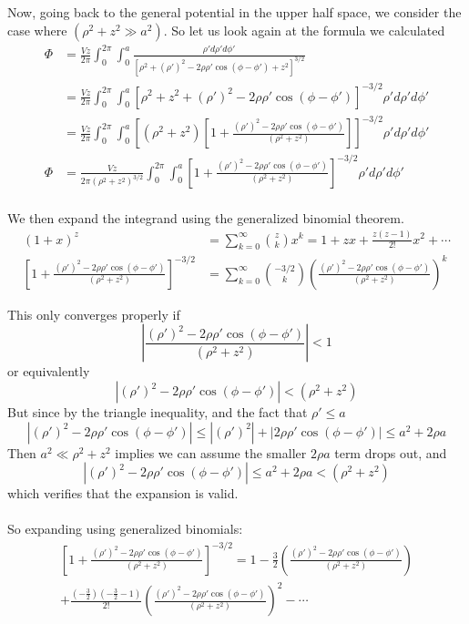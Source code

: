 \documentclass{article}
\begin{document}
Now, going back to the general potential in the upper half space, we consider the case where $(\rho^{2}+z^{2}\gg a^{2})$. So let us look again at the formula we calculated
\begin{align*}
\Phi &= \frac{Vz}{2\pi} \int_{0}^{2\pi}\int_{0}^{a} \frac{\rho' d\rho'd\phi'}{[\rho^{2} + (\rho')^{2} - 2\rho\rho'\cos(\phi-\phi') + z^{2}]^{3/2}}\\
&= \frac{Vz}{2\pi} \int_{0}^{2\pi}\int_{0}^{a} \left[\rho^{2} + z^{2} + (\rho')^{2} - 2\rho\rho'\cos(\phi-\phi')\right]^{-3/2}\rho' d\rho'd\phi'\\
&= \frac{Vz}{2\pi} \int_{0}^{2\pi}\int_{0}^{a} \left[(\rho^{2} + z^{2})\left[1 + \frac{(\rho')^{2} - 2\rho\rho'\cos(\phi-\phi')}{(\rho^{2} + z^{2})}\right]\right]^{-3/2}\rho' d\rho'd\phi'\\
\Phi &= \frac{Vz}{2\pi(\rho^{2} + z^{2})^{3/2}} \int_{0}^{2\pi}\int_{0}^{a} \left[1 + \frac{(\rho')^{2} - 2\rho\rho'\cos(\phi-\phi')}{(\rho^{2} + z^{2})}\right]^{-3/2}\rho' d\rho'd\phi'\\
\end{align*}

We then expand the integrand using the generalized binomial theorem.
\begin{align*}
(1+x)^{z} &= \sum_{k=0}^{\infty} {z\choose k} x^{k} = 1 + zx + \frac{z(z-1)}{2!}x^{2} + \cdots\\
\left[1 + \frac{(\rho')^{2} - 2\rho\rho'\cos(\phi-\phi')}{(\rho^{2} + z^{2})} \right]^{-3/2} &= \sum_{k=0}^{\infty} {-3/2\choose k} \left( \frac{(\rho')^{2} - 2\rho\rho'\cos(\phi-\phi')}{(\rho^{2} + z^{2})} \right)^{k}
\end{align*}

This only converges properly if 
\[ \left| \frac{(\rho')^{2} - 2\rho\rho'\cos(\phi-\phi')}{(\rho^{2} + z^{2})} \right| < 1 \]
or equivalently
\[ \left| (\rho')^{2} - 2\rho\rho'\cos(\phi-\phi') \right| < (\rho^{2} + z^{2}) \]
But since by the triangle inequality, and the fact that $\rho'\le a$
\[ \left| (\rho')^{2} - 2\rho\rho'\cos(\phi-\phi') \right| \le \left| (\rho')^{2} \right| + \left| 2\rho\rho'\cos(\phi-\phi') \right| \le a^{2} + 2\rho a\]
Then $a^{2} \ll \rho^{2} + z^{2}$ implies we can assume the smaller $2\rho a$ term drops out, and
\[ \left| (\rho')^{2} - 2\rho\rho'\cos(\phi-\phi') \right| \le a^{2} + 2\rho a < (\rho^{2} + z^{2}) \]
which verifies that the expansion is valid.\\
\\
So expanding using generalized binomials:
\begin{multline*} 
\left[1 + \frac{(\rho')^{2} - 2\rho\rho'\cos(\phi-\phi')}{(\rho^{2} + z^{2})}\right]^{-3/2} = 1 - \frac{3}{2}\left( \frac{(\rho')^{2} - 2\rho\rho'\cos(\phi-\phi')}{(\rho^{2} + z^{2})} \right)\\
+ \frac{(-\frac{3}{2})(-\frac{3}{2}-1)}{2!}\left( \frac{(\rho')^{2} - 2\rho\rho'\cos(\phi-\phi')}{(\rho^{2} + z^{2})} \right)^{2} - \cdots \end{multline*}
\end{document}
